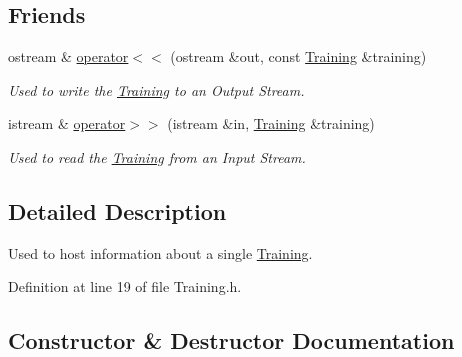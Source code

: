 \subsection*{Friends}
\begin{DoxyCompactItemize}
\item 
ostream \& \hyperlink{class_training_a2a462cd115913a43a1f4d7cbc8635c77}{operator$<$$<$} (ostream \&out, const \hyperlink{class_training}{Training} \&training)
\begin{DoxyCompactList}\small\item\em Used to write the \hyperlink{class_training}{Training} to an Output Stream. \end{DoxyCompactList}\item 
istream \& \hyperlink{class_training_ad76466bb3f1163c39b684ae14adf0ca1}{operator$>$$>$} (istream \&in, \hyperlink{class_training}{Training} \&training)
\begin{DoxyCompactList}\small\item\em Used to read the \hyperlink{class_training}{Training} from an Input Stream. \end{DoxyCompactList}\end{DoxyCompactItemize}


\subsection{Detailed Description}
Used to host information about a single \hyperlink{class_training}{Training}. 

Definition at line 19 of file Training.\+h.



\subsection{Constructor \& Destructor Documentation}
\hypertarget{class_training_af98b1bc7ed710e2fa008a72ad29dbdae}{}\label{class_training_af98b1bc7ed710e2fa008a72ad29dbdae} 
